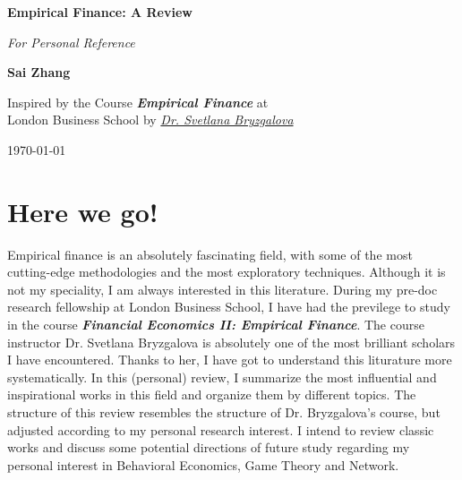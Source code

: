 \documentclass[12pt,openany]{report}
\begin{document}
\begin{titlepage}
    \begin{center}
        \vspace*{1cm}
        
        \Huge
        \textbf{Empirical Finance: A Review}

        \Large
        \textit{For Personal Reference}
            
        \vspace{2.5cm}
        
        \LARGE    
        \textbf{Sai Zhang}
            
        \vfill
        
        \large    
        Inspired by the Course \textbf{\textit{Empirical Finance}} at\\
        London Business School by \href{https://sabryzgalova.com/research/}{\textit{Dr. Svetlana Bryzgalova}}
            
        \vspace{0.8cm}
        \large
        \today
            
    \end{center}
\end{titlepage}


\chapter*{Here we go!}

Empirical finance is an absolutely fascinating field, with some of 
the most cutting-edge methodologies and the most exploratory 
techniques. Although it is not my speciality, I am always interested
in this literature. During my pre-doc research fellowship at London
Business School, I have had the previlege to study in the course
\textit{\textbf{Financial Economics II: Empirical Finance}}. The course
instructor Dr. Svetlana Bryzgalova is absolutely one of the most brilliant
scholars I have encountered. Thanks to her, I have got to understand 
this liturature more systematically. In this (personal) review, I summarize
the most influential and inspirational works in this field and organize
them by different topics. The structure of this review resembles the structure
of Dr. Bryzgalova's course, but adjusted according to my personal research
interest. I intend to review classic works and discuss some potential directions
of future study regarding my personal interest in Behavioral Economics, Game Theory
and Network.
\end{document}
